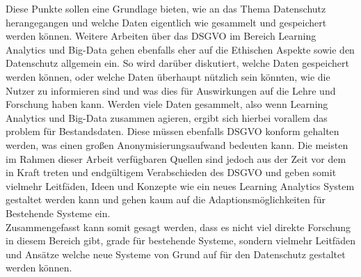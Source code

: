 \documentclass[a4paper, 12pt]{article}
\begin{document}
\noindent Diese Punkte sollen eine Grundlage bieten, wie an das Thema Datenschutz herangegangen und welche Daten eigentlich wie gesammelt und gespeichert werden können. Weitere Arbeiten über das DSGVO im Bereich Learning Analytics und Big-Data gehen ebenfalls eher auf die Ethischen Aspekte sowie den Datenschutz allgemein ein. So wird darüber diskutiert, welche Daten gespeichert werden können, oder welche Daten überhaupt nützlich sein könnten, wie die Nutzer zu informieren sind und was dies für Auswirkungen auf die Lehre und Forschung haben kann. Werden viele Daten gesammelt, also wenn Learning Analytics und Big-Data zusammen agieren, ergibt sich hierbei vorallem das problem für Bestandsdaten. Diese müssen ebenfalls DSGVO konform gehalten werden, was einen großen Anonymisierungsaufwand bedeuten kann. Die meisten im Rahmen dieser Arbeit verfügbaren Quellen sind jedoch aus der Zeit vor dem in Kraft treten und endgültigem Verabschieden des DSGVO und geben somit vielmehr Leitfäden, Ideen und Konzepte wie ein neues Learning Analytics System gestaltet werden kann und gehen kaum auf die Adaptionsmöglichkeiten für Bestehende Systeme ein\cite{hoel_privacy-driven_2016,hoel_implications_2016}.\\
Zusammengefasst kann somit gesagt werden, dass es nicht viel direkte Forschung in diesem Bereich gibt, grade für bestehende Systeme, sondern vielmehr Leitfäden und Ansätze welche neue Systeme von Grund auf für den Datenschutz gestaltet werden können.
\newpage
\end{document}
